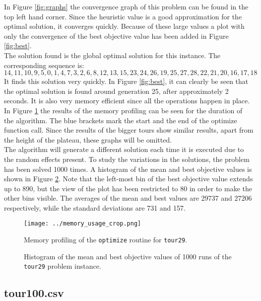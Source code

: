 \documentclass[a4paper,10pt]{article}
\begin{document}
In Figure \ref{fig:graphs} the convergence graph of this problem can be found in the top left hand corner. Since the heuristic value is a good approximation for the optimal solution, it converges quickly. Because of these large values a plot with only the convergence of the best objective value has been added in Figure \ref{fig:best}.\\
The solution found is the global optimal solution for this instance. The corresponding sequence is:
$$14,11,10,9,5,0,1,4,7,3,2,6,8,12,13,15,23,24,26,19,25,27,28,22,21,20,16,17,18$$
It finds this solution very quickly. In Figure \ref{fig:best}, it can clearly be seen that the optimal solution is found around generation 25, after approximately 2 seconds. It is also very memory efficient since all the operations happen in place. In Figure \ref{fig:memory} the results of the memory profiling can be seen for the duration of the algorithm. The blue brackets mark the start and the end of the optimize function call. Since the results of the bigger tours show similar results, apart from the height of the plateau, these graphs will be omitted.\\
The algorithm will generate a different solution each time it is executed due to the random effects present. To study the variations in the solutions, the problem has been solved 1000 times. A histogram of the mean and best objective values is shown in Figure \ref{fig:histogram}. Note that the left-most bin of the best objective value extends up to 890, but the view of the plot has been restricted to 80 in order to make the other bins visible. The averages of the mean and best values are 29737 and 27206 respectively, while the standard deviations are 731 and 157.

\begin{figure}
\centering
\texttt{[image: ../memory\_usage\_crop.png]}
\caption{Memory profiling of the \texttt{optimize} routine for \texttt{tour29}.}
\label{fig:memory}
\end{figure}

\begin{figure}
\centering
\scalebox{1}{}
\caption{Histogram of the mean and best objective values of 1000 runs of the \texttt{tour29} problem instance.}
\label{fig:histogram}
\end{figure}

\subsection{tour100.csv}
\end{document}
